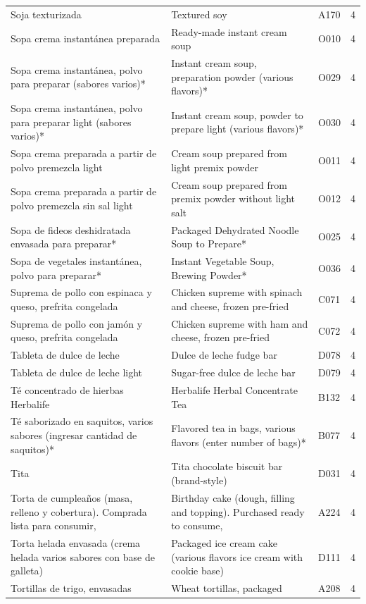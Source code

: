 {\begin{longtable}{p{4.3cm}p{5.5cm}p{1.5cm}p{0.7cm}}
Soja texturizada & Textured soy & A170 & 4\\
Sopa crema instantánea preparada & Ready-made instant cream soup & O010 & 4\\
Sopa crema instantánea, polvo para preparar (sabores varios)* & Instant cream soup, preparation powder (various flavors)* & O029 & 4\\
Sopa crema instantánea, polvo para preparar light (sabores varios)* & Instant cream soup, powder to prepare light (various flavors)* & O030 & 4\\
Sopa crema preparada a partir de polvo premezcla light & Cream soup prepared from light premix powder & O011 & 4\\
Sopa crema preparada a partir de polvo premezcla sin sal light & Cream soup prepared from premix powder without light salt & O012 & 4\\
Sopa de fideos deshidratada envasada para preparar* & Packaged Dehydrated Noodle Soup to Prepare* & O025 & 4\\
Sopa de vegetales instantánea, polvo para preparar* & Instant Vegetable Soup, Brewing Powder* & O036 & 4\\
Suprema de pollo con espinaca y queso, prefrita congelada & Chicken supreme with spinach and cheese, frozen pre-fried & C071 & 4\\
Suprema de pollo con jamón y queso, prefrita congelada & Chicken supreme with ham and cheese, frozen pre-fried & C072 & 4\\
Tableta de dulce de leche & Dulce de leche fudge bar & D078 & 4\\
Tableta de dulce de leche light & Sugar-free dulce de leche bar & D079 & 4\\
Té concentrado de hierbas Herbalife & Herbalife Herbal Concentrate Tea & B132 & 4\\
Té saborizado en saquitos, varios sabores (ingresar cantidad de saquitos)* & Flavored tea in bags, various flavors (enter number of bags)* & B077 & 4\\
Tita & Tita chocolate biscuit bar (brand-style) & D031 & 4\\
Torta de cumpleaños (masa, relleno y cobertura). Comprada lista para consumir, & Birthday cake (dough, filling and topping). Purchased ready to consume, & A224 & 4\\
Torta helada envasada (crema helada varios sabores con base de galleta) & Packaged ice cream cake (various flavors ice cream with cookie base) & D111 & 4\\
Tortillas de trigo, envasadas & Wheat tortillas, packaged & A208 & 4\\

\end{longtable}}
